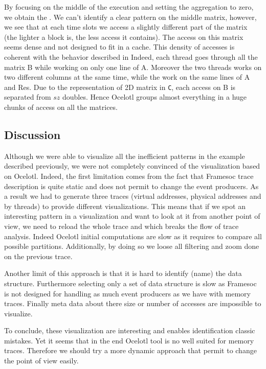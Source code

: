 By focusing on the middle of the execution and setting the aggregation to zero, we obtain the .
We can't identify a clear pattern on the middle matrix, however, we see that at each time slots we access a slightly different part of the matrix (the lighter a block is, the less access it contains).
The access on this matrix seems  dense and not designed to fit in a cache.
This density of accesses is coherent with the behavior described in 
Indeed, each thread goes through all the matrix B while working on only one line of A.
Moreover the two threads works on two different columns at the same time, while the work on the same lines of A and Res.
Due to the representation of 2D matrix in \texttt{C}, each access on B is separated from $sz$ doubles.
Hence \gls{Ocelotl} groups almost everything in a huge chunks of access on all the matrices.

\subsection{Discussion}

Although we were able to visualize all the inefficient patterns in the example described previously, we were not completely convinced of the visualization based on \gls{Ocelotl}.
Indeed, the first limitation comes from the fact that \gls{Framesoc} trace description is quite static and does not permit to change the event producers.
As a result we had to generate three traces (virtual addresses, physical addresses and by threads) to provide different visualizations.
This means that if we spot an interesting pattern in a visualization and want to look at it from another point of view, we need to reload the whole trace and  which breaks the flow of trace analysis.
Indeed \gls{Ocelotl} initial computations are slow as it requires to compare all possible partitions.
Additionally, by doing so we loose all filtering and zoom done on the previous trace.

Another limit of this approach is that it is hard to identify (name) the data structure.
Furthermore selecting only a set of data structure is slow as \gls{Framesoc} is not designed for handling as much event producers as we have with memory traces.
Finally meta data about there size or number of accesses are impossible to visualize.

To conclude, these visualization are interesting and enables identification classic mistakes.
Yet it seems that in the end \gls{Ocelotl} tool is no well suited for memory traces.
Therefore we should try a more dynamic approach that permit to change the point of view easily.

